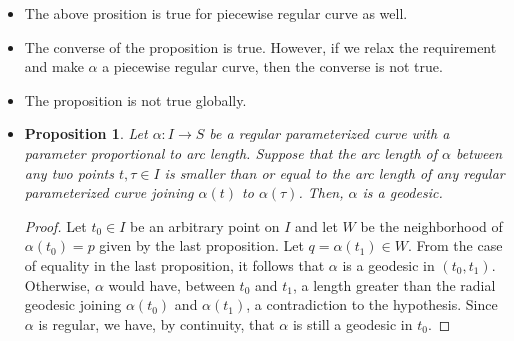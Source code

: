 \documentclass[10pt]{article}
\newtheorem{proposition}[lemma]{Proposition}
\newcommand{\ra}{\rightarrow}
\begin{document}
\begin{itemize}
\begin{proof}
      Suppose finally that $\alpha([0,t_1])$ is not entirely contained in $\bar W$. Let $t_0 \in [0,t_1]$ be the first value for which $\alph(t_0) = x$ belongs to the boundary of $\bar W$. Let $\bar \gamma$ be the radial geodesic $px$ and let $\bar \alpha$ be the restriction of the curve $\alpha$ to the interval $[0,t_0]$. It is clear that $l_\alpha \geq l_{\bar \alpha}$. By the previous argument, $l_{\bar \alpha} \geq l_{\bar \gamma}$. Since $q$ is a point in the interior of $\bar W$, we have that $l_{\bar \gamma} > l_{\gamma}$. We conclude that $l_{\alpha} > l_{\gamma}$, which ends the proof.
    \end{proof}

    \item The above prosition is true for piecewise regular curve as well.

    \item The converse of the proposition is true. However, if we relax the requirement and  make $\alpha$ a piecewise regular curve, then the converse is not true.

    \item The proposition is not true globally.

    \item \begin{proposition}
      Let $\alpha : I \ra S$ be a regular parameterized curve with a parameter proportional to arc length. Suppose that the arc length of $\alpha$ between any two points $t, \tau \in I$ is smaller than or equal to the arc length of any regular parameterized curve joining $\alpha(t)$ to $\alpha(\tau)$. Then, $\alpha$ is a geodesic.
    \end{proposition}
    \begin{proof}
      Let $t_0 \in I$ be an arbitrary point on $I$ and let $W$ be the neighborhood of $\alpha(t_0) = p$ given by the last proposition. Let $q = \alpha(t_1) \in W$. From the case of equality in the last proposition, it follows that $\alpha$ is a geodesic in $(t_0, t_1)$. Otherwise, $\alpha$ would have, between $t_0$ and $t_1$, a length greater than the radial geodesic joining $\alpha(t_0)$ and $\alpha(t_1)$, a contradiction to the hypothesis. Since $\alpha$ is regular, we have, by continuity, that $\alpha$ is still a geodesic in $t_0$.
    \end{proof}
  \end{itemize}
\end{document}
